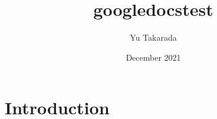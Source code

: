 \documentclass{article}
\title{googledocstest}
\author{Yu Takarada}
\date{December 2021}
\begin{document}
\maketitle

\section{Introduction}
\end{document}
